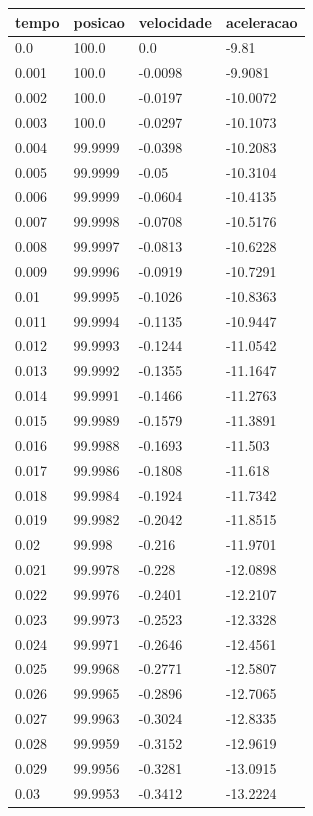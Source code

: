 \begin{tabular}{llll}
\toprule
tempo & posicao & velocidade & aceleracao \\
\midrule
0.0 & 100.0 & 0.0 & -9.81 \\
0.001 & 100.0 & -0.0098 & -9.9081 \\
0.002 & 100.0 & -0.0197 & -10.0072 \\
0.003 & 100.0 & -0.0297 & -10.1073 \\
0.004 & 99.9999 & -0.0398 & -10.2083 \\
0.005 & 99.9999 & -0.05 & -10.3104 \\
0.006 & 99.9999 & -0.0604 & -10.4135 \\
0.007 & 99.9998 & -0.0708 & -10.5176 \\
0.008 & 99.9997 & -0.0813 & -10.6228 \\
0.009 & 99.9996 & -0.0919 & -10.7291 \\
0.01 & 99.9995 & -0.1026 & -10.8363 \\
0.011 & 99.9994 & -0.1135 & -10.9447 \\
0.012 & 99.9993 & -0.1244 & -11.0542 \\
0.013 & 99.9992 & -0.1355 & -11.1647 \\
0.014 & 99.9991 & -0.1466 & -11.2763 \\
0.015 & 99.9989 & -0.1579 & -11.3891 \\
0.016 & 99.9988 & -0.1693 & -11.503 \\
0.017 & 99.9986 & -0.1808 & -11.618 \\
0.018 & 99.9984 & -0.1924 & -11.7342 \\
0.019 & 99.9982 & -0.2042 & -11.8515 \\
0.02 & 99.998 & -0.216 & -11.9701 \\
0.021 & 99.9978 & -0.228 & -12.0898 \\
0.022 & 99.9976 & -0.2401 & -12.2107 \\
0.023 & 99.9973 & -0.2523 & -12.3328 \\
0.024 & 99.9971 & -0.2646 & -12.4561 \\
0.025 & 99.9968 & -0.2771 & -12.5807 \\
0.026 & 99.9965 & -0.2896 & -12.7065 \\
0.027 & 99.9963 & -0.3024 & -12.8335 \\
0.028 & 99.9959 & -0.3152 & -12.9619 \\
0.029 & 99.9956 & -0.3281 & -13.0915 \\
0.03 & 99.9953 & -0.3412 & -13.2224 \\

\end{tabular}
